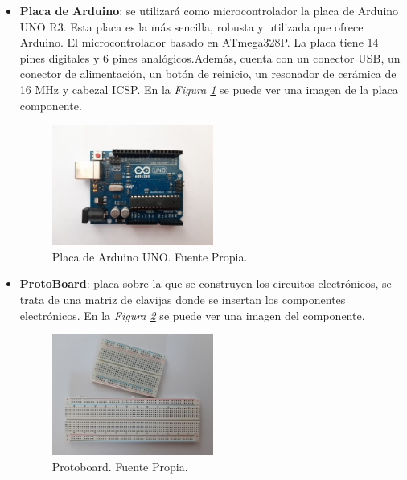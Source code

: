 \begin{itemize}
\item \textbf{Placa de Arduino}\cite{Arduino1,Arduino2}: se utilizará como microcontrolador la placa de Arduino UNO R3. Esta placa es la más sencilla, robusta y utilizada que ofrece Arduino. El microcontrolador basado en ATmega328P\cite{atmega328P}. La placa tiene 14 pines digitales y 6 pines analógicos.Además, cuenta con un conector USB, un conector de alimentación, un botón de reinicio, un resonador de cerámica de 16 MHz y cabezal ICSP.  En la \textit{Figura \ref{fig:arduino}} se puede ver una imagen de la placa componente.
\begin{figure}[h!]
    \centering
    \includegraphics[width=0.5\textwidth]{img/imgArduinoUNO.jpg}
    \caption{Placa de Arduino UNO. Fuente Propia.}
    \label{fig:arduino} 
\end{figure}

\item \textbf{ProtoBoard}: placa sobre la que se construyen los circuitos electrónicos, se trata de una matriz de clavijas donde se insertan los componentes electrónicos. En la \textit{Figura \ref{fig:protoboard}} se puede ver una imagen del componente.
\begin{figure}[h!]
    \centering
    \includegraphics[width=0.5\textwidth]{img/imgProtoboards.JPG}
    \caption{Protoboard. Fuente Propia.}
    \label{fig:protoboard} 
\end{figure}


\end{itemize}
